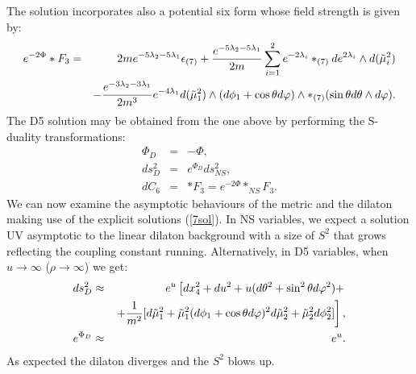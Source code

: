 \documentclass[a4paper,12pt]{article}
\begin{document}
The solution incorporates also a potential six form whose field strength is given by:
\begin{eqnarray}
e^{-2\Phi}\ast F_{3} &=& 2me^{-5\lambda_{2}-5\lambda_{1}}\epsilon_{(7)}+{e^{-5\lambda_{2}-5\lambda_{1}}\over{2m}}\sum_{i=1}^{2}e^{-2\lambda_{i}}\ast_{(7)}de^{2\lambda_{i}}\wedge d(\tilde\mu_{i}^{2})\nonumber \\ 
&& -{e^{-3\lambda_{2}-3\lambda_{1}}\over 2m^3}e^{-4\lambda_{1}}d(\tilde\mu_{1}^{2})\wedge(d\phi_{1}+ \cos\theta d\varphi)\wedge \ast_{(7)}(\sin\theta d\theta\wedge d\varphi).
\label{eq1}
\end{eqnarray}
The D5 solution may be obtained from the one above by performing the S-duality transformations:
\begin{eqnarray}
\Phi_{D} &=& -\Phi, \nonumber \\
ds^{2}_{D} &=& e^{\Phi_{D}}ds^{2}_{NS}, \nonumber \\
dC_{6} &=& \ast F_{3}= e^{-2\Phi}\ast_{NS}F_{3}.
\label{eq2}
\end{eqnarray}
We can now examine the asymptotic behaviours of the metric and the dilaton making use of the explicit solutions (\ref{7sol}). 
In NS variables, we expect a solution UV asymptotic to the linear dilaton background \cite{little} with a size of $S^2$ that grows reflecting the coupling constant
running. Alternatively, in D5 variables,
when $u\rightarrow \infty$ ($\rho \rightarrow \infty$) we get:
\begin{eqnarray}
ds^{2}_{D}&\approx& e^{u}\left[ dx_{4}^2 + du^2 + u(d\theta^2 + \sin^{2}\theta d\varphi^2)+ \right. \nonumber \\
&& \left. +{1\over m^2}[d{\tilde\mu}_{1}^{2}+{\tilde\mu}_{1}^{2}(d\phi_{1}+ \cos\theta d\varphi)^2 d{\tilde\mu}_{2}^{2}+{\tilde\mu}_{2}^{2}d\phi_{2}^{2}] \right], \nonumber \\
e^{\Phi_{D}}&\approx& e^{u}.
\label{UV}
\end{eqnarray}
As expected the dilaton diverges and the $S^{2}$ blows up.
\end{document}
